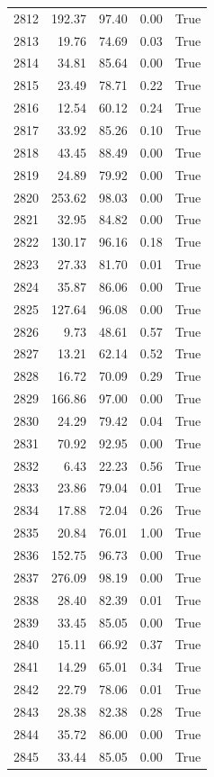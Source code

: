 \begin{longtable}{rrrrr}
2812 & 192.37 & 97.40 & 0.00 & True \\
2813 & 19.76 & 74.69 & 0.03 & True \\
2814 & 34.81 & 85.64 & 0.00 & True \\
2815 & 23.49 & 78.71 & 0.22 & True \\
2816 & 12.54 & 60.12 & 0.24 & True \\
2817 & 33.92 & 85.26 & 0.10 & True \\
2818 & 43.45 & 88.49 & 0.00 & True \\
2819 & 24.89 & 79.92 & 0.00 & True \\
2820 & 253.62 & 98.03 & 0.00 & True \\
2821 & 32.95 & 84.82 & 0.00 & True \\
2822 & 130.17 & 96.16 & 0.18 & True \\
2823 & 27.33 & 81.70 & 0.01 & True \\
2824 & 35.87 & 86.06 & 0.00 & True \\
2825 & 127.64 & 96.08 & 0.00 & True \\
2826 & 9.73 & 48.61 & 0.57 & True \\
2827 & 13.21 & 62.14 & 0.52 & True \\
2828 & 16.72 & 70.09 & 0.29 & True \\
2829 & 166.86 & 97.00 & 0.00 & True \\
2830 & 24.29 & 79.42 & 0.04 & True \\
2831 & 70.92 & 92.95 & 0.00 & True \\
2832 & 6.43 & 22.23 & 0.56 & True \\
2833 & 23.86 & 79.04 & 0.01 & True \\
2834 & 17.88 & 72.04 & 0.26 & True \\
2835 & 20.84 & 76.01 & 1.00 & True \\
2836 & 152.75 & 96.73 & 0.00 & True \\
2837 & 276.09 & 98.19 & 0.00 & True \\
2838 & 28.40 & 82.39 & 0.01 & True \\
2839 & 33.45 & 85.05 & 0.00 & True \\
2840 & 15.11 & 66.92 & 0.37 & True \\
2841 & 14.29 & 65.01 & 0.34 & True \\
2842 & 22.79 & 78.06 & 0.01 & True \\
2843 & 28.38 & 82.38 & 0.28 & True \\
2844 & 35.72 & 86.00 & 0.00 & True \\
2845 & 33.44 & 85.05 & 0.00 & True \\

\end{longtable}
